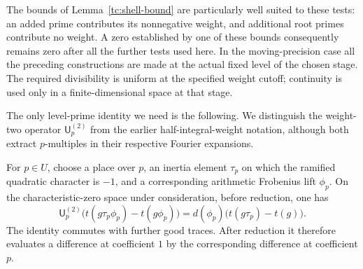 The bounds of Lemma~\ref{tc:shell-bound} are particularly well suited to
these tests: an added prime contributes its nonnegative weight, and
additional root primes contribute no weight.  A zero established by
one of these bounds consequently remains zero after all the further
tests used here.  In the moving-precision case all the preceding
constructions are made at the actual fixed level of the chosen stage.
The required divisibility is uniform at the specified weight cutoff;
continuity is used only in a finite-dimensional space at that stage.

The only level-prime identity we need is the following.  We distinguish
the weight-two operator $\mathsf U_p^{(2)}$ from the earlier
half-integral-weight notation, although both extract $p$-multiples in
their respective Fourier expansions.

\begin{lemma}
\label{tc:inertia-identity}\label{co:inertia}
For $p\in U$, choose a place over $p$, an inertia element $\tau_p$
on which the ramified quadratic character is $-1$, and a corresponding
arithmetic Frobenius lift $\phi_p$.  On the characteristic-zero space
under consideration, before reduction, one has
\begin{equation}
 \mathsf U_p^{(2)}
       \bigl(t(g\tau_p\phi_p)-t(g\phi_p)\bigr)
 =d(\phi_p)\bigl(t(g\tau_p)-t(g)\bigr).
 \label{tc:exact-level-identity}
\end{equation}
The identity commutes with further good traces.  After reduction it
therefore evaluates a difference at coefficient $1$ by the corresponding
difference at coefficient $p$.
\end{lemma}

